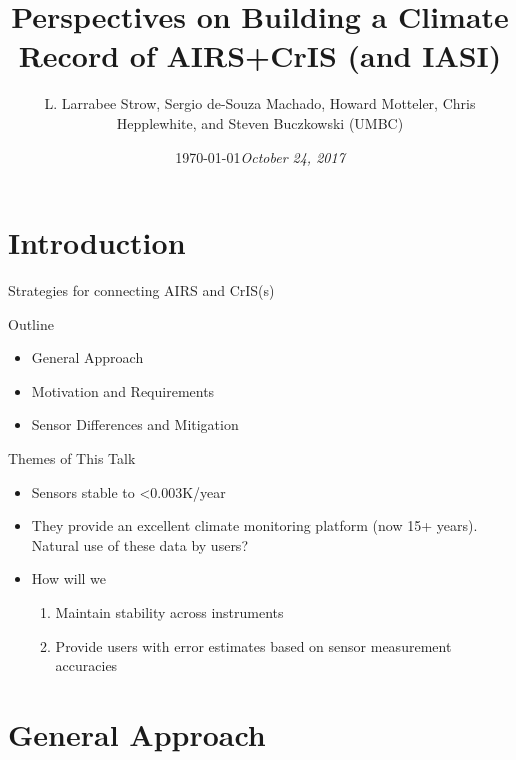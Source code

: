 \documentclass[10pt,t]{beamer}
\author{L. Larrabee Strow, Sergio de-Souza Machado, Howard Motteler, Chris Hepplewhite, and Steven Buczkowski (UMBC)}
\date{\today}
\title{Perspectives on Building a Climate Record of AIRS+CrIS (and IASI)}
\date{\textit{\footnotesize October 24, 2017}}
\begin{document}
\maketitle
{}

\section{Introduction}
\label{sec:org047a7d5}

\begin{frame}[label={sec:org648c8cc}]{Strategies for connecting AIRS and CrIS(s)}
\begin{block}{Outline}
\begin{itemize}
\item General Approach
\item Motivation and Requirements
\item Sensor Differences and Mitigation
\end{itemize}
\end{block}
\begin{block}{Themes of This Talk}
\begin{itemize}
\item Sensors stable to  <0.003K/year
\item They provide an excellent climate monitoring platform (now 15+ years).  Natural use of these data by users?
\item How will we 
\begin{enumerate}
\item Maintain stability across instruments
\item Provide users with error estimates based on sensor measurement accuracies
\end{enumerate}
\end{itemize}
\end{block}
\end{frame}


\section{General Approach}
\label{sec:orga4ad907}
\end{document}
